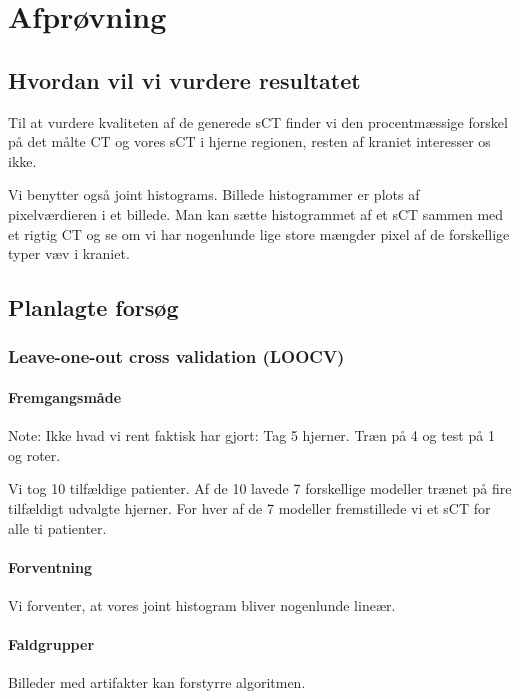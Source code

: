 \section{Afprøvning}

\subsection{Hvordan vil vi vurdere resultatet}


Til at vurdere kvaliteten af de generede sCT finder vi den procentmæssige
forskel på det målte CT og vores sCT i hjerne regionen, resten af kraniet
interesser os ikke. 

Vi benytter også joint histograms. Billede histogrammer er plots af
pixelværdieren i et billede. Man kan sætte histogrammet af et sCT sammen med et
rigtig CT og se om vi har nogenlunde lige store mængder pixel af de forskellige
typer væv i kraniet. 

\subsection{Planlagte forsøg}

\subsubsection{Leave-one-out cross validation (LOOCV)}
\paragraph{Fremgangsmåde}
Note: Ikke hvad vi rent faktisk har gjort:
Tag 5 hjerner. Træn på 4 og test på 1 og roter.

Vi tog 10 tilfældige patienter. Af de 10 lavede 7 forskellige modeller trænet
på fire tilfældigt udvalgte hjerner. For hver af de 7 modeller fremstillede vi
et sCT for alle ti patienter.  



\paragraph{Forventning}
Vi forventer, at vores joint histogram bliver nogenlunde lineær. 

\paragraph{Faldgrupper}
Billeder med artifakter kan forstyrre algoritmen. 


